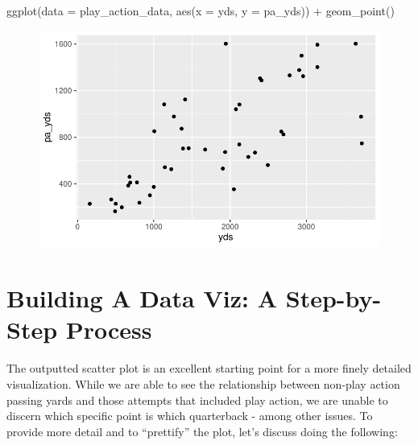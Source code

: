 \documentclass[
  letterpaper,
]{krantz}
\newenvironment{Shaded}{\begin{snugshade}}{\end{snugshade}}
\newcommand{\AttributeTok}[1]{\textcolor[rgb]{0.40,0.45,0.13}{#1}}
\newcommand{\FunctionTok}[1]{\textcolor[rgb]{0.28,0.35,0.67}{#1}}
\newcommand{\NormalTok}[1]{\textcolor[rgb]{0.00,0.23,0.31}{#1}}
\newcommand{\SpecialCharTok}[1]{\textcolor[rgb]{0.37,0.37,0.37}{#1}}
\begin{document}
\begin{Shaded}
\begin{Highlighting}[]
\FunctionTok{ggplot}\NormalTok{(}\AttributeTok{data =}\NormalTok{ play\_action\_data, }\FunctionTok{aes}\NormalTok{(}\AttributeTok{x =}\NormalTok{ yds, }\AttributeTok{y =}\NormalTok{ pa\_yds)) }\SpecialCharTok{+}
  \FunctionTok{geom\_point}\NormalTok{()}
\end{Highlighting}
\end{Shaded}

\begin{figure}[H]

{\centering \includegraphics{04-nfl-analytics-visualization_files/figure-pdf/example-pa-action-plot-1.pdf}

}

\end{figure}

\hypertarget{building-a-data-viz-a-step-by-step-process}{%
\section{Building A Data Viz: A Step-by-Step
Process}\label{building-a-data-viz-a-step-by-step-process}}

The outputted scatter plot is an excellent starting point for a more
finely detailed visualization. While we are able to see the relationship
between non-play action passing yards and those attempts that included
play action, we are unable to discern which specific point is which
quarterback - among other issues. To provide more detail and to
``prettify'' the plot, let's discuss doing the following:
\end{document}
